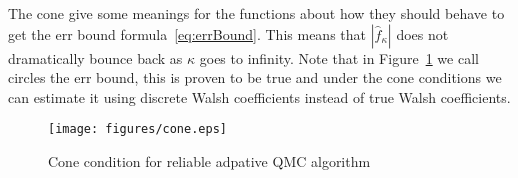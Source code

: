 The cone give some meanings for the functions about how they should behave to get the err bound formula~\eqref{eq:errBound}. This means that $|\hat{f}_\kappa|$ does not dramatically bounce back as $\kappa$ goes to infinity. Note that in Figure~\ref{fg:cone} we call circles the err bound, this is proven to be true and under the cone conditions we can estimate it using discrete Walsh coefficients instead of true Walsh coefficients.
\begin{figure}[h]
    \centering
    \texttt{[image: figures/cone.eps]}
    \caption{Cone condition for reliable adpative QMC algorithm}
    \label{fg:cone}
\end{figure}
